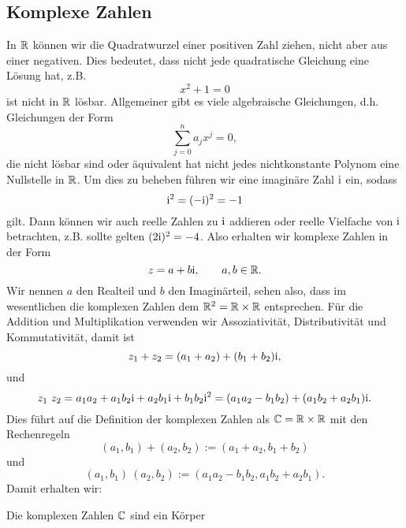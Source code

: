 \subsection{Komplexe Zahlen}
\label{\detokenize{grundlagen/zahlensysteme:komplexe-zahlen}}
In \(\mathbb{R}\) können wir die Quadratwurzel einer positiven Zahl ziehen, nicht aber aus einer negativen. Dies bedeutet, dass nicht jede quadratische Gleichung eine Lösung hat, z.B.
\begin{equation*}
 x^2 +1 = 0
\end{equation*}
ist nicht in \(\mathbb{R}\) lösbar. Allgemeiner gibt es viele algebraische Gleichungen, d.h. Gleichungen der Form
\begin{equation*}
 \sum_{j=0}^n a_j x^j = 0,
\end{equation*}
die nicht lösbar sind oder äquivalent hat nicht jedes nichtkonstante Polynom eine Nullstelle in \(\mathbb{R}\). Um dies zu beheben führen wir eine imaginäre Zahl \(\mathrm{i}\) ein, sodass
\begin{equation*}
 \mathrm{i}^2 = (-\mathrm{i})^2 = -1
\end{equation*}
gilt. Dann können wir auch reelle Zahlen zu \(\mathrm{i}\) addieren oder reelle Vielfache von \(\mathrm{i}\) betrachten, z.B. sollte gelten \((2\mathrm{i})^2=-4\). Also erhalten wir komplexe Zahlen in der Form
\begin{equation*}
 z = a + b \mathrm{i}, \qquad a, b \in \mathbb{R}.
\end{equation*}
Wir nennen \(a\) den Realteil und \(b\) den Imaginärteil, sehen also, dass im wesentlichen die komplexen Zahlen dem \(\mathbb{R}^2 = \mathbb{R} \times \mathbb{R}\) entsprechen.
Für die Addition und Multiplikation verwenden wir Assoziativität, Distributivität und Kommutativität, damit ist
\begin{equation*}
 z_1+z_2 = (a_1+a_2) + (b_1+b_2)\mathrm{i},
\end{equation*}
und
\begin{equation*}
 z_1 ~z_2 = a_1 a_2 + a_1 b_2 \mathrm{i} + a_2 b_1 \mathrm{i} + b_1 b_2 \mathrm{i}^2 = (a_1 a_2 - b_1 b_2) + ( a_1 b_2   + a_2 b_1) \mathrm{i} .
\end{equation*}
Dies führt auf die Definition der komplexen Zahlen als \(\mathbb{C} = \mathbb{R} \times \mathbb{R}\) mit den Rechenregeln
\begin{equation*}
 (a_1,b_1) +(a_2,b_2) := (a_1+a_2,b_1+b_2)
\end{equation*}
und
\begin{equation*}
 (a_1,b_1) ~(a_2,b_2) := (a_1 a_2 - b_1 b_2,a_1 b_2   + a_2 b_1).
\end{equation*}
Damit erhalten wir:
\label{grundlagen/zahlensysteme:theorem-29}
\begin{theorem}{}{}



Die komplexen Zahlen \(\mathbb{C}\) sind ein Körper
\end{theorem}

